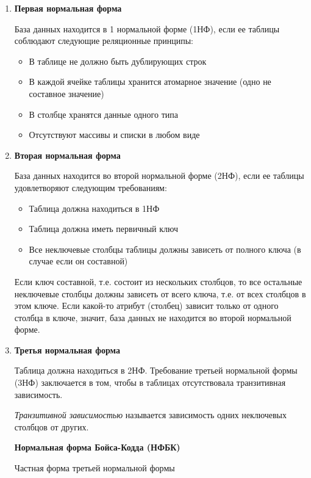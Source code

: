 \begin{enumerate}
    \item \textbf{Первая нормальная форма}

     База данных находится в 1 нормальной форме (1НФ), если ее таблицы соблюдают следующие реляционные принципы:

    \begin{itemize}
	    \item В таблице не должно быть дублирующих строк
	    \item В каждой ячейке таблицы хранится атомарное значение (одно не составное значение)
	    \item В столбце хранятся данные одного типа
	    \item Отсутствуют массивы и списки в любом виде
    \end{itemize}

    \item  \textbf{Вторая нормальная форма}

    База данных находится во второй нормальной форме (2НФ), если ее таблицы удовлетворяют следующим требованиям:

    \begin{itemize}
	    \item Таблица должна находиться в 1НФ
    	\item Таблица должна иметь первичный ключ
	    \item Все неключевые столбцы таблицы должны зависеть от полного ключа (в случае если он составной)
    \end{itemize}

    Если ключ составной, т.е. состоит из нескольких столбцов, то все остальные неключевые столбцы должны зависеть от всего ключа, т.е. от всех столбцов в этом ключе. Если какой-то атрибут (столбец) зависит только от одного столбца в ключе, значит, база данных не находится во второй нормальной форме.

    \item \textbf{Третья нормальная форма}

    Таблица должна находиться в 2НФ. Требование третьей нормальной формы (3НФ) заключается в том, чтобы в таблицах отсутствовала транзитивная зависимость.

    \textit{Транзитивной зависимостью} называется зависимость одних неключевых столбцов от других.

    \textbf{Нормальная форма Бойса-Кодда (НФБК)} 

    Частная форма третьей нормальной формы


\end{enumerate}
